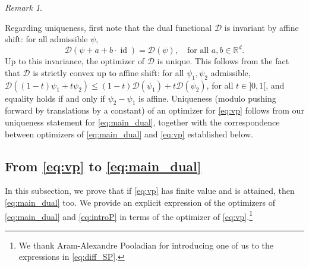 \documentclass[reqno, a4paper]{amsart}
\DeclareMathOperator{\id}{id}
\theoremstyle{plain}
\theoremstyle{definition}
\theoremstyle{remark}
\newtheorem{remark}[theorem]{Remark}
\numberwithin{equation}{section}
\numberwithin{theorem}{section}
\newcommand{\R}{\mathbb{R}}
\newcommand{\D}{\mathcal{D}}
\begin{document}
\begin{remark}
\begin{enumerate}
			Regarding uniqueness, first note that the dual functional $\mathcal D$ is invariant by affine shift: for all admissible $\psi$, $$\mathcal D(\psi + a + b \cdot \id) = \mathcal D (\psi),\quad \text{for all } a,b \in \R^d.$$ Up to this invariance, the optimizer of $\mathcal D$ is unique. This follows from the fact that $\D$ is strictly convex up to affine shift: for all $\psi_1,\psi_2$ admissible, $\D((1-t)\psi_1 + t \psi_2) \leq (1-t) \D(\psi_1) + t \D(\psi_2)$, for all $ t \in ]0,1[$, 
			and equality holds if and only if $\psi_2 - \psi_1$ is affine. %
			Uniqueness (modulo pushing forward by translations by a constant) of an optimizer for \eqref{eq:vp}  follows from our uniqueness statement for \eqref{eq:main_dual}, together with the correspondence between optimizers of \eqref{eq:main_dual} and \eqref{eq:vp} established below.
		\end{enumerate}
	\end{remark}
	
	
	
	\subsection{From \eqref{eq:vp} to \eqref{eq:main_dual}} 
	
	In this subsection, we prove that if \eqref{eq:vp} has finite value and is attained, then \eqref{eq:main_dual} too. We provide an explicit expression of the optimizers of \eqref{eq:main_dual} and \eqref{eq:introP} in terms of the optimizer of \eqref{eq:vp}.\footnote{We thank Aram-Alexandre Pooladian for introducing one of us to the expressions in \eqref{eq:diff_SP}.}
	
\end{document}

